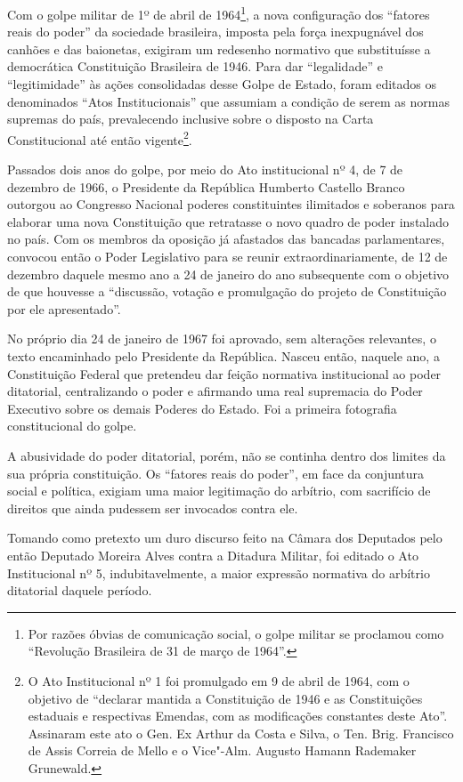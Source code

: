 Com o golpe militar de 1º de abril de 1964\footnote{Por razões óbvias de
  comunicação social, o golpe militar se proclamou como
  ``Revolução Brasileira de 31 de março de 1964''.}, a nova
configuração dos ``fatores reais do poder'' da sociedade
brasileira, imposta pela força inexpugnável dos canhões e das baionetas,
exigiram um redesenho normativo que substituísse a democrática
Constituição Brasileira de 1946. Para dar ``legalidade'' e
``legitimidade'' às ações consolidadas desse Golpe de Estado, foram
editados os denominados ``Atos Institucionais'' que assumiam a
condição de serem as normas supremas do país, prevalecendo inclusive
sobre o disposto na Carta Constitucional até então vigente\footnote{O
  Ato Institucional nº 1 foi promulgado em 9 de abril de 1964, com
  o objetivo de ``declarar mantida a Constituição de 1946 e as
  Constituições estaduais e respectivas Emendas, com as modificações
  constantes deste Ato''. Assinaram este ato o Gen. Ex Arthur da Costa e
  Silva, o Ten. Brig. Francisco de Assis Correia de Mello e o Vice"-Alm.
  Augusto Hamann Rademaker Grunewald.}.

Passados dois anos do golpe, por meio do Ato institucional nº 4, de 7 de
dezembro de 1966, o Presidente da República Humberto Castello Branco
outorgou ao Congresso Nacional poderes constituintes ilimitados e
soberanos para elaborar uma nova Constituição que retratasse o novo
quadro de poder instalado no país. Com os membros da oposição já
afastados das bancadas parlamentares, convocou então o Poder Legislativo
para se reunir extraordinariamente, de 12 de dezembro daquele mesmo ano
a 24 de janeiro do ano subsequente com o objetivo de que houvesse a
``discussão, votação e promulgação do projeto de Constituição por
ele apresentado''.

No próprio dia 24 de janeiro de 1967 foi aprovado, sem alterações
relevantes, o texto encaminhado pelo Presidente da República. Nasceu
então, naquele ano, a Constituição Federal que pretendeu dar feição
normativa institucional ao poder ditatorial, centralizando o poder e
afirmando uma real supremacia do Poder Executivo sobre os demais Poderes
do Estado. Foi a primeira fotografia constitucional do golpe.

A abusividade do poder ditatorial, porém, não se continha dentro dos
limites da sua própria constituição. Os ``fatores reais do
poder'', em face da conjuntura social e política, exigiam uma maior
legitimação do arbítrio, com sacrifício de direitos que ainda pudessem
ser invocados contra ele.

Tomando como pretexto um duro discurso feito na Câmara dos Deputados
pelo então Deputado Moreira Alves contra a Ditadura Militar, foi editado
o Ato Institucional nº 5, indubitavelmente, a maior expressão
normativa do arbítrio ditatorial daquele período.

